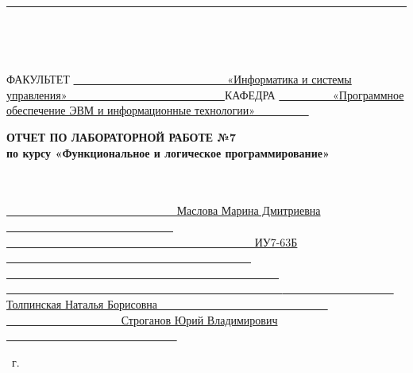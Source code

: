 \begin{titlepage}
    \noindent
	\rule{17cm}{3pt}
    ~\\
    \begin{spacing}{0.1}
        ~\\
    \end{spacing}
	\noindent ФАКУЛЬТЕТ
    \uline
    {
            ~~~~~~~~~~~~~~~~~~~~~~~~~~~
            «Информатика и системы управления»
            ~~~~~~~~~~~~~~~~~~~~~~~~~~~
    }
    \newline\newline
	\noindent КАФЕДРА
    \uline{
            ~~~~~~~~~
            «Программное обеспечение ЭВМ и информационные технологии»
            ~~~~~~~~~
        }
    \newline\newline
    \newline\newline
    \newline\newline
    \newline

	\fontsize{18pt}{18pt}\selectfont
	\begin{center}
        \textbf{ОТЧЕТ ПО ЛАБОРАТОРНОЙ РАБОТЕ №7}\\
        \textbf{по курсу «Функциональное и логическое программирование»}\\
        ~\\
	\end{center}
    ~\\

	\fontsize{14pt}{14pt}\selectfont
	\noindent{}
    \uline{
        ~~~~~~~~~~~~~~~~~~~~~~~~~~~~~~
        Маслова Марина Дмитриевна
        ~~~~~~~~~~~~~~~~~~~~~~~~~~~~~~
    }
    \newline\newline
	\noindent{}
    \uline{
        ~~~~~~~~~~~~~~~~~~~~~~~~~~~~~~~~~~~~~~~~~~~~
        ИУ7-63Б
        ~~~~~~~~~~~~~~~~~~~~~~~~~~~~~~~~~~~~~~~~~~~~
    }
    \newline\newline
	\noindent{}
    \uline{
        ~~~~~~~~~~~~~~~~~~~~~~~~~~~~~~~~~~~~~~~~~~~~~~~~~
        ~~~~~~~~~~~~~~~~~~~~~~~~~~~~~~~~~~~~~~~~~~~~~~~~~
    }
    \newline\newline
	\noindent{}
    \uline{
        ~~~~~~~~~~~~~~~~~~~~
        Толпинская Наталья Борисовна
        ~~~~~~~~~~~~~~~~~~~~~~~~~~~~~~
    }
    \newline\newline
	\noindent{}
    \uline{
        ~~~~~~~~~~~~~~~~~~~~
        Строганов Юрий Владимирович
        ~~~~~~~~~~~~~~~~~~~~~~~~~~~~~~
    }
    \newline\newline
    ~\\
    \vspace{17mm}

	\begin{center}
		\the\year~г.
	\end{center}

    \restoregeometry
\end{titlepage}
